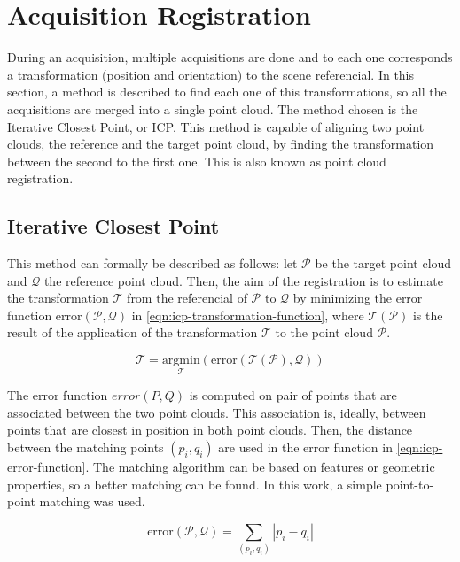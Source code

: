 \section{Acquisition Registration}
\label{section:acquisition-registration}

During an acquisition, multiple acquisitions are done and to each one corresponds a transformation (position and orientation) to the scene referencial. In this section, a method is described to find each one of this transformations, so all the acquisitions are merged into a single point cloud. The method chosen is the Iterative Closest Point, or ICP. This method is capable of aligning two point clouds, the reference and the target point cloud, by finding the transformation between the second to the first one. This is also known as point cloud registration.

\subsection{Iterative Closest Point}

\newcommand{\T}{\mathcal{T}}
\newcommand{\Pt}{\mathcal{P}}
\newcommand{\Q}{\mathcal{Q}}

This method can formally be described as follows: let $\Pt$ be the target point cloud and $\Q$ the reference point cloud. Then, the aim of the registration is to estimate the transformation $\T$ from the referencial of $\Pt$ to $\Q$ by minimizing the error function $\textrm{error}(\Pt, \Q)$ in \cref{eqn:icp-transformation-function}, where $\T(\Pt)$ is the result of the application of the transformation $\T$ to the point cloud $\Pt$.

\begin{equation}
\label{eqn:icp-transformation-function}
    \mathcal{T} = \underset{\T}{\textrm{argmin}}(\mathrm{error}(\T(\Pt), \Q))
\end{equation}

The error function $error(P, Q)$ is computed on pair of points that are associated between the two point clouds. This association is, ideally, between points that are closest in position in both point clouds. Then, the distance between the matching points $(p_i, q_i)$ are used in the error function in \cref{eqn:icp-error-function}. The matching algorithm can be based on features or geometric properties, so a better matching can be found. In this work, a simple point-to-point matching was used. 

\begin{equation}
\label{eqn:icp-error-function}
    \textrm{error}(\Pt, \Q) = \sum_{(p_i, q_i)}{|p_i - q_i|}
\end{equation}

